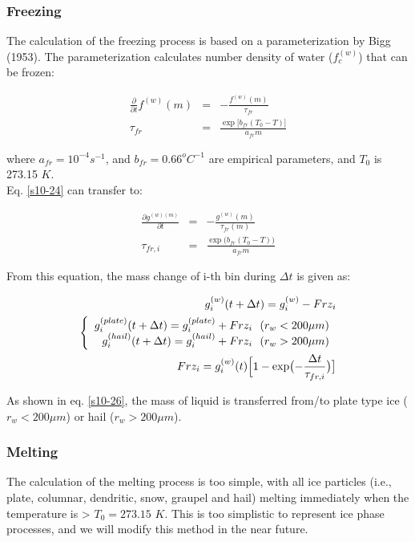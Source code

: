 \subsubsection{Freezing}
The calculation of the freezing process is based on a parameterization by Bigg (1953)\cite{bigg_1953}. The parameterization calculates number density of water ($f_{c}^{(w)}$) that can be frozen:

\begin{eqnarray}
\frac{\partial}{\partial t}f^{(w)}(m)&=&-\frac{f^{(w)}(m)}{\tau_{fr}}\label{s10-24}\\
\tau_{fr}&=&\frac{\exp \bigl[b_{fr}(T_{0}-T)\bigr]}{a_{fr} m}\nonumber
\end{eqnarray}

where $a_{fr}=10^{-4}s^{-1}$, and $b_{fr}=0.66^{o}C^{-1}$ are empirical parameters, and $T_{0}$ is 273.15 $K$.\\
Eq. \ref{s10-24} can transfer to:

\begin{eqnarray}
\frac{\partial g^{(w)(m)}}{\partial t}&=&-\frac{g^{(w)}(m)}{\tau_{fr}(m)}\\
\tau_{fr,i}&=&\frac{\exp\bigl (b_{fr}(T_{0}-T)\bigr )}{a_{fr}m}\nonumber
\end{eqnarray}

From this equation, the mass change of i-th bin during $\Delta t$ is given as:

\begin{eqnarray}
g_{i}^{(w)}(t+\Delta t)=g_{i}^{(w)}-Frz_{i}\\
\left \{
\begin{array}{r}
g_{i}^{(plate)}(t+\Delta t)=g_{i}^{(plate)}+Frz_{i}\:\:\: (r_{w}<200\mu m)\\
g_{i}^{(hail)}(t+\Delta t)=g_{i}^{(hail)}+Frz_{i}\:\:\: (r_{w}>200\mu m)
\end{array} \right.\label{s10-26}\\
Frz_{i}=g_{i}^{(w)}(t)\Bigl [1-\exp\bigl (-\frac{\Delta t}{\tau_{fr,i}}\bigr )\bigr]\nonumber
\end{eqnarray}


 As shown in eq. \ref{s10-26}, the mass of liquid is transferred from/to plate type ice ($r_{w}<200\mu m$) or hail ($r_{w}>200\mu m$).

\subsubsection{Melting}
The calculation of the melting process is too simple, with all ice particles (i.e., plate, columnar, dendritic, snow, graupel and hail) melting immediately when the temperature is > $T_{0}=273.15$ $K$. This is too simplistic to represent ice phase processes, and we will modify this method in the near future.


